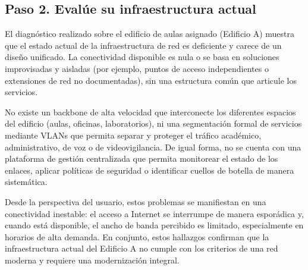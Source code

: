 \subsection*{Paso 2. Evalúe su infraestructura actual}

El diagnóstico realizado sobre el edificio de aulas asignado (Edificio A) muestra que el estado actual de la infraestructura de red es deficiente y carece de un diseño unificado. La conectividad disponible es nula o se basa en soluciones improvisadas y aisladas (por ejemplo, puntos de acceso independientes o extensiones de red no documentadas), sin una estructura común que articule los servicios.

No existe un backbone de alta velocidad que interconecte los diferentes espacios del edificio (aulas, oficinas, laboratorios), ni una segmentación formal de servicios mediante VLANs que permita separar y proteger el tráfico académico, administrativo, de voz o de videovigilancia. De igual forma, no se cuenta con una plataforma de gestión centralizada que permita monitorear el estado de los enlaces, aplicar políticas de seguridad o identificar cuellos de botella de manera sistemática.

Desde la perspectiva del usuario, estos problemas se manifiestan en una conectividad inestable: el acceso a Internet se interrumpe de manera esporádica y, cuando está disponible, el ancho de banda percibido es limitado, especialmente en horarios de alta demanda. En conjunto, estos hallazgos confirman que la infraestructura actual del Edificio A no cumple con los criterios de una red moderna y requiere una modernización integral.